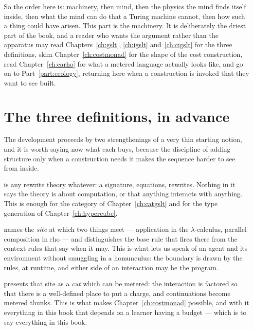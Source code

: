 So the order here is: machinery, then mind, then the physics the mind
finds itself inside, then what the mind can do that a Turing machine
cannot, then how such a thing could have arisen.
This part is the machinery.
It is deliberately the driest part of the book, and a reader who wants
the argument rather than the apparatus may read
Chapters~\ref{ch:gslt}, \ref{ch:igslt} and~\ref{ch:cigslt} for the three
definitions, skim Chapter~\ref{ch:costmonad} for the shape of the cost
construction, read Chapter~\ref{ch:carho} for what a metered language
actually looks like, and go on to Part~\ref{part:ecology}, returning here
when a construction is invoked that they want to see built.

\section{The three definitions, in advance}

The development proceeds by two strengthenings of a very thin starting
notion, and it is worth saying now what each buys, because the discipline
of adding structure only when a construction needs it makes the sequence
harder to see from inside.

\begin{description}[leftmargin=1.6em,style=nextline]
\item[A GSLT] is any rewrite theory whatever: a signature, equations,
  rewrites.
  Nothing in it says the theory is about computation, or that anything
  interacts with anything.
  This is enough for the category of Chapter~\ref{ch:catgslt} and for the
  type generation of Chapter~\ref{ch:hypercube}.
\item[An interactive GSLT] names the \emph{site} at which two things meet
  --- application in the $\lambda$-calculus, parallel composition in rho ---
  and distinguishes the base rule that fires there from the context rules
  that say when it may.
  This is what lets us speak of an agent and its environment without
  smuggling in a homunculus: the boundary is drawn by the rules, at
  runtime, and either side of an interaction may be the program.
\item[A continued interactive GSLT] presents that site as a
  \emph{cut} which can be metered: the interaction is factored so that
  there is a well-defined place to put a charge, and continuations become
  metered thunks.
  This is what makes Chapter~\ref{ch:costmonad} possible, and with it
  everything in this book that depends on a learner having a budget ---
  which is to say everything in this book.
\end{description}

